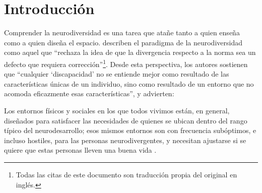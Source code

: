
\section{Introducción}

Comprender la neurodiversidad es una tarea que atañe tanto a quien enseña como a quien diseña el espacio. \citet{pellicano2022} describen el paradigma de la neurodiversidad como aquel que \enquote{rechaza la idea de que la divergencia respecto a la norma sea un defecto que requiera corrección}\footnote{Todas las citas de este documento son traducción propia del original en inglés.}.
Desde esta perspectiva, los autores sostienen que \enquote{cualquier \enquote{discapacidad} no se entiende mejor como resultado de las características únicas de un individuo, sino como resultado de un entorno que no acomoda eficazmente esas características}, y advierten:

\begin{displayquote}
Los entornos físicos y sociales en los que todos vivimos están, en general, diseñados para satisfacer las necesidades de quienes se ubican dentro del rango típico del neurodesarrollo; esos mismos entornos son con frecuencia subóptimos, e incluso hostiles, para las personas neurodivergentes, y necesitan ajustarse si se quiere que estas personas lleven una buena vida \citep{pellicano2022}.
\end{displayquote}

